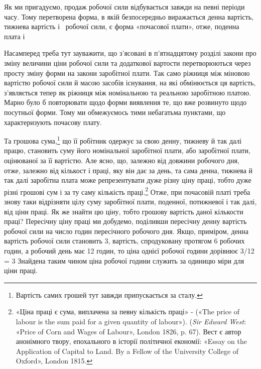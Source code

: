 Як ми пригадуємо, продаж робочої сили відбувається завжди
на певні періоди часу. Тому перетворена форма, в якій безпосередньо
виражається денна вартість, тижнева вартість і~ робочої
сили, є форма «почасової плати», отже, поденна плата і~

Насамперед треба тут зауважити, що з’ясовані в п’ятнадцятому
розділі закони про зміну величини ціни робочої сили та додаткової
вартости перетворюються через просту зміну форми
на закони заробітної плати. Так само ріжниця між міновою вартістю
робочої сили й масою засобів існування, на які обмінюється
ця вартість, з’являється тепер як ріжниця між номінальною та
реальною заробітною платою. Марно було б повторювати щодо
форми виявлення те, що вже розвинуто щодо посутньої форми.
Тому ми обмежуємось тими небагатьма пунктами, що характеризують
почасову плату.

Та грошова сума,\footnote{
Вартість самих грошей тут завжди припускається за сталу.
} що її робітник одержує за свою денну,
тижневу й так далі працю, становить суму його номінальної
заробітної плати, або заробітної плати, оцінюваної за її вартістю.
Але ясно, що, залежно від довжини робочого дня, отже,
залежно від кількост і праці, яку він дає за день, та сама денна,
тижнева й так далі заробітна плата може репрезентувати дуже
різну ціну праці, тобто дуже різні грошові сум і за ту саму кількість
праці.\footnote{
«Ціна праці є сума, виплачена за певну кількість праці» - («The
price of labour is the sum paid for a given quantity of labour»).
(\emph{Sir Edward West}: «Price of Corn and Wages of Labour», London 1826,
p. 67). Вест є автор анонімного твору, епохального в історії політичної економії:
«Essay on the Application of Capital to Land. By a Fellow of the
University College of Oxford», London 1815.
} Отже, при почасовій платі треба знову таки відрізняти
цілу суму заробітної плати, поденної, потижневої і так
далі, від ціни праці. Як же знайти цю ціну, тобто грошову вартість
даної кількости праці? Пересічну ціну праці ми добудемо,
поділивши пересічну денну вартість робочої сили на число годин
пересічного робочого дня. Якщо, приміром, денна вартість
робочої сили становить 3, вартість, спродуковану протягом
6 робочих годин, а робочий день має 12 годин, то ціна однієї
робочої години дорівнює 3/12 = 3 Знайдена
таким чином ціна робочої години служить за одиницю міри для
ціни праці.

